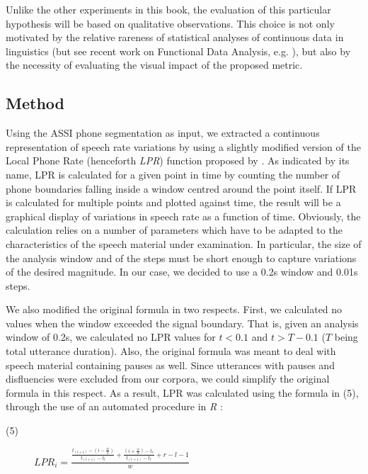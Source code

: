 Unlike the other experiments in this book, the evaluation of this particular hypothesis will be based on qualitative observations. This choice is not only motivated by the relative rareness of statistical analyses of continuous data in linguistics (but see recent work on Functional Data Analysis, e.g. \citealt{gubian2010automatic}), but also by the necessity of evaluating the visual impact of the proposed metric. 

\subsection{Method}\label{sec442}
Using the ASSI phone segmentation as input, we extracted a continuous representation of speech rate variations by using a slightly modified version of the Local Phone Rate (henceforth \textit{LPR}) function proposed by \citet{pfitzinger2001phonetische}. As indicated by its name, LPR is calculated for a given point in time by counting the number of phone boundaries falling inside a window centred around the point itself. If LPR is calculated for multiple points and plotted against time, the result will be a graphical display of variations in speech rate as a function of time. Obviously, the calculation relies on a number of parameters which have to be adapted to the characteristics of the speech material under examination. In particular, the size of the analysis window and of the steps must be short enough to capture variations of the desired magnitude. In our case, we decided to use a 0.2s window and 0.01s steps.

We also modified the original formula in two respects. First, we calculated no values when the window exceeded the signal boundary. That is, given an analysis window of 0.2s, we calculated no LPR values for $t<0.1$ and $t>T-0.1$ ($T$ being total utterance duration). Also, the original formula was meant to deal with speech material containing pauses as well. Since utterances with pauses and disfluencies were excluded from our corpora, we could simplify the original formula in this respect. As a result, LPR was calculated using the formula in (5), through the use of an automated procedure in \textit{R} \citep{r2008r}:

\begin{description}
   \item[(5)] $LPR_{i}=\frac{\frac{t_{(l+1)}-(i-\frac{w}{2})}{t_{(l+1)}-t_{l}}+\frac{(i+\frac{w}{2})-t_{r}}{t_{(r+1)}-t_{r}}+r-l-1}{w}$
\end{description}

